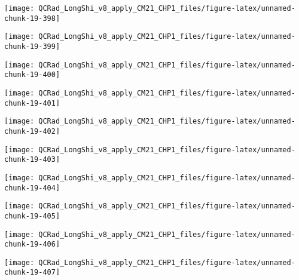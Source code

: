 \documentclass[
  10pt,
  a4paper,oneside]{article}
\begin{document}
\begin{center}\texttt{[image: QCRad\_LongShi\_v8\_apply\_CM21\_CHP1\_files/figure-latex/unnamed-chunk-19-398]} \end{center}

\begin{center}\texttt{[image: QCRad\_LongShi\_v8\_apply\_CM21\_CHP1\_files/figure-latex/unnamed-chunk-19-399]} \end{center}

\begin{center}\texttt{[image: QCRad\_LongShi\_v8\_apply\_CM21\_CHP1\_files/figure-latex/unnamed-chunk-19-400]} \end{center}

\begin{center}\texttt{[image: QCRad\_LongShi\_v8\_apply\_CM21\_CHP1\_files/figure-latex/unnamed-chunk-19-401]} \end{center}

\begin{center}\texttt{[image: QCRad\_LongShi\_v8\_apply\_CM21\_CHP1\_files/figure-latex/unnamed-chunk-19-402]} \end{center}

\begin{center}\texttt{[image: QCRad\_LongShi\_v8\_apply\_CM21\_CHP1\_files/figure-latex/unnamed-chunk-19-403]} \end{center}

\begin{center}\texttt{[image: QCRad\_LongShi\_v8\_apply\_CM21\_CHP1\_files/figure-latex/unnamed-chunk-19-404]} \end{center}

\begin{center}\texttt{[image: QCRad\_LongShi\_v8\_apply\_CM21\_CHP1\_files/figure-latex/unnamed-chunk-19-405]} \end{center}

\begin{center}\texttt{[image: QCRad\_LongShi\_v8\_apply\_CM21\_CHP1\_files/figure-latex/unnamed-chunk-19-406]} \end{center}

\begin{center}\texttt{[image: QCRad\_LongShi\_v8\_apply\_CM21\_CHP1\_files/figure-latex/unnamed-chunk-19-407]} \end{center}
\end{document}

